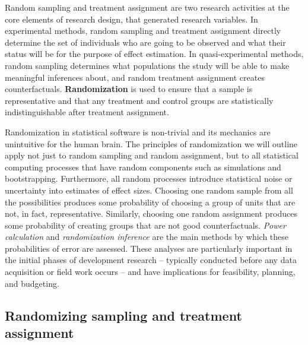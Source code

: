 Random sampling and treatment assignment are two research activities  
at the core elements of research design, 
that generated research variables.
In experimental methods, 
random sampling and treatment assignment directly determine
the set of individuals who are going to be observed
and what their status will be for the purpose of effect estimation.
In quasi-experimental methods, 
random sampling determines what populations the study
will be able to make meaningful inferences about,
and random treatment assignment creates counterfactuals.
\textbf{Randomization} 
is used to ensure that a sample is representative and
that any treatment and control groups are statistically indistinguishable
after treatment assignment.

Randomization in statistical software is non-trivial
and its mechanics are unintuitive for the human brain.
The principles of randomization we will outline
apply not just to random sampling and random assignment,
but to all statistical computing processes that have random components
such as simulations and bootstrapping.
Furthermore, all random processes introduce statistical noise
or uncertainty into estimates of effect sizes.
Choosing one random sample from all the possibilities produces some probability of
choosing a group of units that are not, in fact, representative.
Similarly, choosing one random assignment produces some probability of
creating groups that are not good counterfactuals.
\textit{Power calculation} and \textit{randomization inference}
are the main methods by which these probabilities of error are assessed.
These analyses are particularly important in the initial phases of development research --
typically conducted before any data acquisition or field work occurs --
and have implications for feasibility, planning, and budgeting.

\subsection{Randomizing sampling and treatment assignment}

